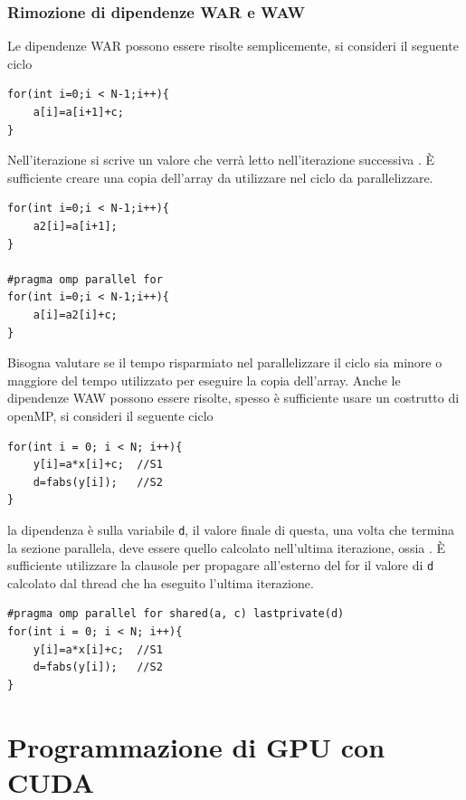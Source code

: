 \documentclass[10pt, letterpaper]{report}
\begin{document}
\subsection{Rimozione di dipendenze WAR e WAW}
Le dipendenze WAR possono essere risolte semplicemente, si consideri il seguente ciclo
\begin{lstlisting}[style=CStyle]
for(int i=0;i < N-1;i++){
    a[i]=a[i+1]+c;
}
\end{lstlisting}
Nell'iterazione  si scrive un valore che verrà letto nell'iterazione successiva . È sufficiente creare una copia dell'array  da utilizzare nel ciclo da parallelizzare.
\begin{lstlisting}[style=CStyle]
for(int i=0;i < N-1;i++){
    a2[i]=a[i+1];
}

#pragma omp parallel for 
for(int i=0;i < N-1;i++){
    a[i]=a2[i]+c;
}
\end{lstlisting}
Bisogna valutare se il tempo risparmiato nel parallelizzare il ciclo sia minore o maggiore del tempo utilizzato per eseguire la copia dell'array.\acc 
Anche le dipendenze WAW possono essere risolte, spesso è sufficiente usare un costrutto di openMP, si consideri il seguente ciclo
\begin{lstlisting}[style=CStyle]
for(int i = 0; i < N; i++){
    y[i]=a*x[i]+c;  //S1 
    d=fabs(y[i]);   //S2
}
\end{lstlisting}
la dipendenza è sulla variabile \texttt{d}, il valore finale di questa, una volta che termina la sezione  parallela, deve essere quello calcolato nell'ultima iterazione, ossia . È sufficiente utilizzare la clausole  per propagare all'esterno del for il valore di \texttt{d} calcolato dal thread che ha eseguito l'ultima iterazione.
\begin{lstlisting}[style=CStyle]
#pragma omp parallel for shared(a, c) lastprivate(d)
for(int i = 0; i < N; i++){
    y[i]=a*x[i]+c;  //S1 
    d=fabs(y[i]);   //S2
}
\end{lstlisting}





























\chapter{Programmazione di GPU con CUDA}
\end{document}
